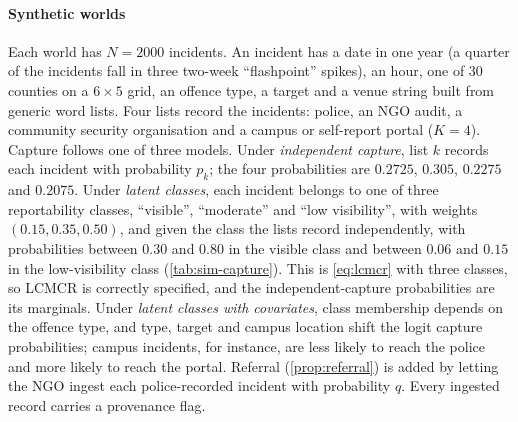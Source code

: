 \paragraph{Synthetic worlds} Each world has $N=2000$ incidents. An incident has a date in one year (a quarter of the incidents fall in three two-week ``flashpoint'' spikes), an hour, one of 30 counties on a $6\times5$ grid, an offence type, a target and a venue string built from generic word lists. Four lists record the incidents: police, an NGO audit, a community security organisation and a campus or self-report portal ($K=4$). Capture follows one of three models. Under \emph{independent capture}, list $k$ records each incident with probability $p_k$; the four probabilities are $0.2725$, $0.305$, $0.2275$ and $0.2075$. Under \emph{latent classes}, each incident belongs to one of three reportability classes, ``visible'', ``moderate'' and ``low visibility'', with weights $(0.15,0.35,0.50)$, and given the class the lists record independently, with probabilities between $0.30$ and $0.80$ in the visible class and between $0.06$ and $0.15$ in the low-visibility class (\cref{tab:sim-capture}). This is \eqref{eq:lcmcr} with three classes, so LCMCR is correctly specified, and the independent-capture probabilities are its marginals. Under \emph{latent classes with covariates}, class membership depends on the offence type, and type, target and campus location shift the logit capture probabilities; campus incidents, for instance, are less likely to reach the police and more likely to reach the portal. Referral (\cref{prop:referral}) is added by letting the NGO ingest each police-recorded incident with probability $q$. Every ingested record carries a provenance flag.

